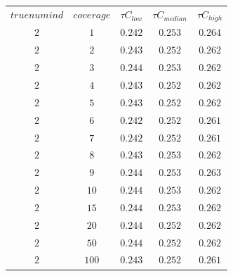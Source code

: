 \begin{tabular}{ccccc}
$truenumind$ & $coverage$ & ${\tau}C_{low}$ & ${\tau}C_{median}$ & ${\tau}C_{high}$\\
$2$ & $1$ & $0.242$ & $0.253$ & $0.264$\\
$2$ & $2$ & $0.243$ & $0.252$ & $0.262$\\
$2$ & $3$ & $0.244$ & $0.253$ & $0.262$\\
$2$ & $4$ & $0.243$ & $0.252$ & $0.262$\\
$2$ & $5$ & $0.243$ & $0.252$ & $0.262$\\
$2$ & $6$ & $0.242$ & $0.252$ & $0.261$\\
$2$ & $7$ & $0.242$ & $0.252$ & $0.261$\\
$2$ & $8$ & $0.243$ & $0.253$ & $0.262$\\
$2$ & $9$ & $0.244$ & $0.253$ & $0.263$\\
$2$ & $10$ & $0.244$ & $0.253$ & $0.262$\\
$2$ & $15$ & $0.244$ & $0.253$ & $0.262$\\
$2$ & $20$ & $0.244$ & $0.252$ & $0.262$\\
$2$ & $50$ & $0.244$ & $0.252$ & $0.262$\\
$2$ & $100$ & $0.243$ & $0.252$ & $0.261$\\
\end{tabular}
